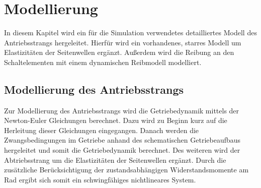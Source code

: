 \chapter{Modellierung}\label{ch:ch2}
In diesem Kapitel wird ein für die Simulation verwendetes detailliertes Modell des Antriebsstrangs hergeleitet. Hierfür wird ein vorhandenes, starres Modell um Elastizitäten der Seitenwellen ergänzt. Außerdem wird die Reibung an den Schaltelementen mit einem dynamischen Reibmodell modelliert.


\section{Modellierung des Antriebsstrangs}
Zur Modellierung des Antriebsstrangs wird die Getriebedynamik mittels der Newton-Euler Gleichungen berechnet. Dazu wird zu Beginn kurz auf die Herleitung dieser Gleichungen eingegangen. Danach werden die Zwangsbedingungen im Getriebe anhand des schematischen Getriebeaufbaus hergeleitet und somit die Getriebedynamik berechnet. Des weiteren wird der Abtriebsstrang um die Elastizitäten der Seitenwellen ergänzt. Durch die zusätzliche Berücksichtigung der zustandsabhängigen Widerstandsmomente am Rad ergibt sich somit ein schwingfähiges nichtlineares System. 

